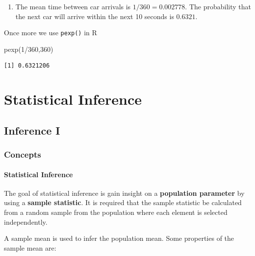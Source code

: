 \documentclass[
  letterpaper,
  DIV=11,
  numbers=noendperiod]{scrreprt}
\newenvironment{Shaded}{\begin{snugshade}}{\end{snugshade}}
\newcommand{\DecValTok}[1]{\textcolor[rgb]{0.68,0.00,0.00}{#1}}
\newcommand{\FunctionTok}[1]{\textcolor[rgb]{0.28,0.35,0.67}{#1}}
\newcommand{\NormalTok}[1]{\textcolor[rgb]{0.00,0.23,0.31}{#1}}
\newcommand{\SpecialCharTok}[1]{\textcolor[rgb]{0.37,0.37,0.37}{#1}}
\providecommand{\tightlist}{%
  \setlength{\itemsep}{0pt}\setlength{\parskip}{0pt}}\usepackage{longtable,booktabs,array}
\begin{document}
\begin{enumerate}
\def\labelenumi{\arabic{enumi}.}
\setcounter{enumi}{1}
\tightlist
\item
  The mean time between car arrivals is \(1/360=0.002778\). The
  probability that the next car will arrive within the next 10 seconds
  is \(0.6321\).
\end{enumerate}

Once more we use \texttt{pexp()} in R

\begin{Shaded}
\begin{Highlighting}[numbers=left,,]
\FunctionTok{pexp}\NormalTok{(}\DecValTok{1}\SpecialCharTok{/}\DecValTok{360}\NormalTok{,}\DecValTok{360}\NormalTok{)}
\end{Highlighting}
\end{Shaded}

\begin{verbatim}
[1] 0.6321206
\end{verbatim}

\part{Statistical Inference}

\hypertarget{inference-i}{%
\chapter{Inference I}\label{inference-i}}

\hypertarget{concepts-10}{%
\section{Concepts}\label{concepts-10}}

\hypertarget{statistical-inference-1}{%
\subsection*{Statistical Inference}\label{statistical-inference-1}}

The goal of statistical inference is gain insight on a
\textbf{population parameter} by using a \textbf{sample statistic}. It
is required that the sample statistic be calculated from a random sample
from the population where each element is selected independently.

A sample mean is used to infer the population mean. Some properties of
the sample mean are:
\end{document}
